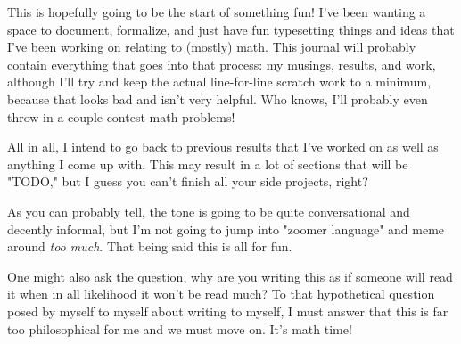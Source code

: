 This is hopefully going to be the start of something fun! I've been wanting a
space to document, formalize, and just have fun typesetting things and ideas
that I've been working on relating to (mostly) math.  This journal will probably contain everything that goes into that
process: my musings, results, and work, although I'll try and keep the actual
line-for-line scratch work to a minimum, because that looks bad and isn't very
helpful. Who knows, I'll probably even throw in a couple contest math problems!

All in all, I intend to go back to previous results that I've worked on as well
as anything I come up with. This may result in a lot of sections that will be
"TODO," but I guess you can't finish all your side projects, right?

As you can probably tell, the tone is going to be quite conversational and
decently informal, but I'm not going to jump into "zoomer language" and meme
around \textit{too much}. That being said this is all for fun.


One might also ask the question, why are you writing this as if someone will
read it when in all likelihood it won't be read much? To that hypothetical
question posed by myself to myself about writing to myself, I must answer that
this is far too philosophical for me and we must move on. It's math time!
